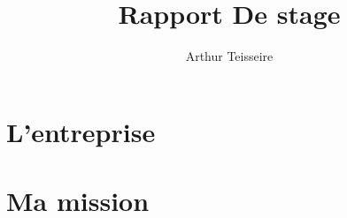 \documentclass[12pt]{report}
\title{Rapport De stage}
\author{Arthur Teisseire}
\begin{document}
	

	\tableofcontents
	
	\part{L'entreprise}
		
		
	\part{Ma mission}
\end{document}
